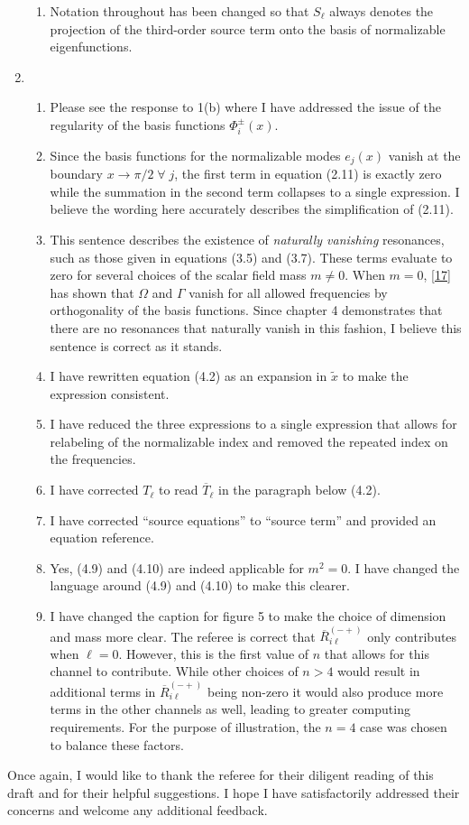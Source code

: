 \documentclass[11pt,letterpaper]{article}
\begin{document}
\begin{enumerate}
\begin{enumerate}
        \item Notation throughout has been changed so that $S_\ell$ always denotes the projection of the third-order source term onto the basis of normalizable eigenfunctions.
    \end{enumerate}
    \item %
    \begin{enumerate}
        \item Please see the response to 1(b) where I have addressed the issue of the regularity of the basis functions $\Phi^\pm_i(x)$.
        \item Since the basis functions for the normalizable modes $e_j(x)$ vanish at the boundary
        ${x \to \pi/2 \; \forall \; j}$, the first term in equation (2.11) is exactly zero while the summation in the second term collapses to a single expression. I believe the wording here accurately describes the simplification of (2.11).
        \item This sentence describes the existence of \emph{naturally vanishing} resonances, such as those given in equations (3.5) and (3.7). These terms evaluate to zero for several choices of the scalar field mass $m \neq 0$. When $m = 0$, [\href{https://arxiv.org/pdf/1407.6273.pdf}{17}] has shown that $\Omega$ and $\Gamma$ vanish for all allowed frequencies by orthogonality of the 
        basis functions. Since chapter 4 demonstrates that there are no resonances that naturally vanish in this fashion, I believe this sentence is correct as it stands.
        \item I have rewritten equation (4.2) as an expansion in $\tilde x$ to make the expression consistent.
        \item I have reduced the three expressions to a single expression that allows for relabeling of the normalizable index and removed the repeated index on the frequencies.
        \item I have corrected $T_\ell$ to read $\overline{T}_\ell$ in the paragraph below (4.2).
        \item I have corrected ``source equations'' to ``source term'' and provided an equation reference.
        \item Yes, (4.9) and (4.10) are indeed applicable for $m^2 = 0$. I have changed the language around (4.9) and (4.10) to make this clearer.
        \item I have changed the caption for figure 5 to make the choice of dimension and mass more clear. The referee is correct that $\overline R^{(-+)}_{i\ell}$ only contributes when $\ell = 0$. However, this is the first value of $n$ that allows for this channel to contribute. While other choices of $n > 4$ would result in additional terms in $\overline R^{(-+)}_{i\ell}$ being non-zero it would also produce more terms in the other channels as well, leading to greater computing requirements. For the purpose of illustration, the $n = 4$ case was chosen to balance these factors.
    \end{enumerate}   
\end{enumerate}

Once again, I would like to thank the referee for their diligent reading of this draft and for their helpful suggestions. I hope I have satisfactorily addressed their concerns and welcome any additional feedback.
\end{document}
